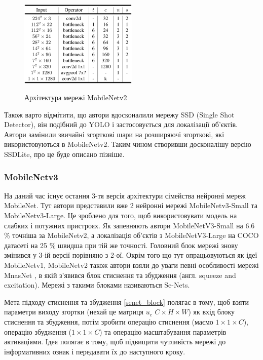 \begin{figure}[H]
    \centering
    \includegraphics[width=0.5\textwidth]{images/cnn_mobilenetv2_architecture}  \cite{mobilenetv2}
    \caption{Архітектура мережі MobileNetv2
        \label{fig:cnn:mobilenetv2_architecture}
    }
\end{figure}


Також варто відмітити, що автори вдосконалили мережу SSD (Single Shot Detector), він подібний
до YOLO і застосовується для локалізації об'єктів. Автори замінили звичайні згорткові шари
на розширяючі згорткові, які використовуються в MobileNetv2. Таким чином створивши досконалішу
версію SSDLite, про це буде описано пізніше.



\subsubsection{MobileNetv3}

На даний час існує остання 3-тя версія \cite{mobilenetv3} архітектури сімейства нейронні мереж MobileNet.
Тут автори представили вже 2 нейронні мережі MobileNetv3-Small та MobileNetv3-Large.
Це зроблено для того, щоб використовувати модель на слабких і потужних пристроях.
Як запевняють автори MobileNetV3-Small на 6.6 \% точніша за MobileNetv2, а локалізація об'єктів
з MobileNetV3-Large на COCO датасеті на 25 \% швидша при тій же точності.
Головний блок мережі знову змінився у 3-ій версії порівняно з 2-ої.
Окрім того що тут опрацьовуються як ідеї MobileNetv1, MobileNetv2 також автори взяли
до уваги певні особливості мережі MnasNet \cite{mnasnet}, в якій з'явився блок стиснення та збудження
(англ. squeeze and excitation). Мережі з такими блоками називаються Se-Nets.

Мета підходу стиснення та збудження \ref{senet_block} полягає в тому, щоб взяти параметри виходу згортки (нехай
це матриця $u_c$ $C \times H \times W$) як вхід блоку стиснення та збудження,
потім зробити операцію стиснення (маємо $1 \times 1 \times C$), операцію збудження ($1 \times 1 \times C$) та
операцію масштабування параметрів активаціями.
Ідея полягає в тому, щоб підвищити чутливість мережі до інформативних ознак і передавати їх
до наступного кроку.

